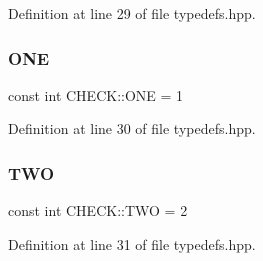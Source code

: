 Definition at line 29 of file typedefs.\+hpp.

\mbox{\label{namespace_c_h_e_c_k_acf8ecf93ddfb75456112712630f8f722}} 
\subsubsection{\texorpdfstring{O\+NE}{ONE}}
{\footnotesize\ttfamily const int C\+H\+E\+C\+K\+::\+O\+NE = 1}



Definition at line 30 of file typedefs.\+hpp.

\mbox{\label{namespace_c_h_e_c_k_a2b112aaec4c59311376a5a60f291aa48}} 
\subsubsection{\texorpdfstring{T\+WO}{TWO}}
{\footnotesize\ttfamily const int C\+H\+E\+C\+K\+::\+T\+WO = 2}



Definition at line 31 of file typedefs.\+hpp.

